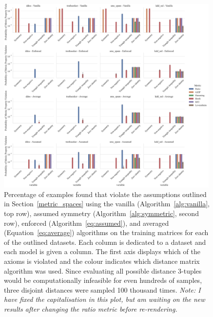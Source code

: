 \documentclass[preprint,12pt]{article}
\newcommand{\cm}[1]{\textit{{\color{blue}#1}}}
\begin{document}
\begin{figure}[h!]
    \centering
    \includegraphics[width=0.99\textwidth]{old_images/read_world_check.pdf}
    \caption{Percentage of examples found that violate the assumptions outlined in Section~\ref{metric_spaces} using the vanilla (Algorithm~\ref{alg:vanilla}, top row), assumed symmetry (Algorithm~\ref{alg:symmetric}, second row), enforced (Algorithm~\ref{eq:assumed}), and averaged (Equation~\ref{eq:average}) algorithms on the training matrices for each of the outlined datasets. Each column is dedicated to a dataset and each model is given a column. The first axis displays which of the axioms is violated and the colour indicates which distance matrix algorithm was used. Since evaluating all possible distance 3-tuples would be computationally infeasible for even hundreds of samples, three disjoint distances were sampled  100 thousand times. \cm{Note: I have fixed the capitalisation in this plot, but am waiting on the new results after changing the ratio metric before re-rendering.}}
    \label{fig:real_world_check}
\end{figure}
\end{document}
